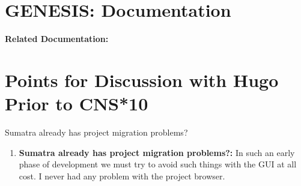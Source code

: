 \documentclass[12pt]{article}
\begin{document}
\section*{GENESIS: Documentation}

{\bf Related Documentation:}

\section*{Points for Discussion with Hugo Prior to CNS*10}

Sumatra already has project migration problems?

\begin{enumerate}
\item {\bf Sumatra already has project migration problems?:} In such an early phase of development we must try to avoid such things
with the GUI at all cost.  I never had any problem with the project browser.


\end{enumerate}
\end{document}
